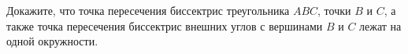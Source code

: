 \begin{ex}
	\begin{condition}
		Докажите, что точка пересечения биссектрис треугольника \( ABC \), точки \( B  \) и \( C \), а также точка пересечения биссектрис внешних углов с вершинами \( B  \) и \( C  \) лежат на одной окружности.
	\end{condition}
\end{ex}